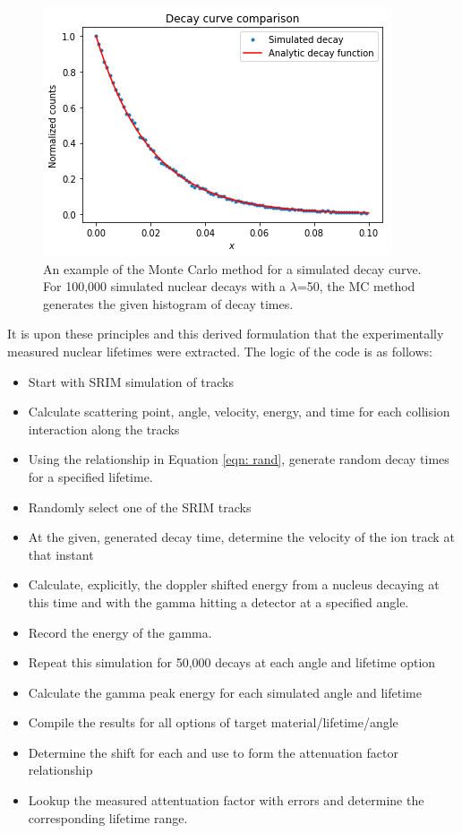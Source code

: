 \begin{figure}
\centering
\includegraphics[width=0.85\linewidth]{figures/simCompareExample.png}
\caption{An example of the Monte Carlo method for a simulated decay curve. For 100,000 simulated nuclear decays with a $\lambda$=50, the MC method generates the given histogram of decay times.  }
\label{fig: simCompare}
\end{figure}


It is upon these principles and this derived formulation that the experimentally measured nuclear lifetimes were extracted. The logic of the code is as follows:

\begin{itemize}
\item Start with SRIM simulation of tracks
\item Calculate scattering point, angle, velocity, energy, and time for each collision interaction along the tracks
\item Using the relationship in Equation \ref{eqn: rand}, generate random decay times for a specified lifetime. 
\item Randomly select one of the SRIM tracks
\item At the given, generated decay time, determine the velocity of the ion track at that instant
\item Calculate, explicitly, the doppler shifted energy from a nucleus decaying at this time and with the gamma hitting a detector at a specified angle. 
\item Record the energy of the gamma.
\item Repeat this simulation for 50,000 decays at each angle and lifetime option
\item Calculate the gamma peak energy for each simulated angle and lifetime
\item Compile the results for all options of target material/lifetime/angle
\item Determine the shift for each and use to form the attenuation factor relationship
\item Lookup the measured attentuation factor with errors and determine the corresponding lifetime range.
\end{itemize}

